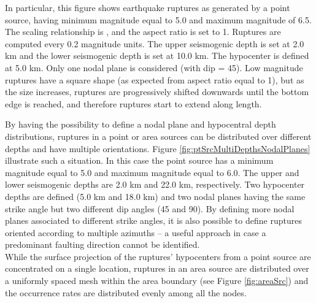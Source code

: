 \documentclass[11pt,a4paper,headings=small,dvips]{scrartcl}
\begin{document}
In particular, this figure shows earthquake ruptures as generated by 
a point source, having minimum magnitude equal to 5.0 and maximum 
magnitude of 6.5. The scaling relationship is \citet{wells1994}, and 
the aspect ratio is set to 1. Ruptures are computed every 0.2 magnitude 
units. 
The upper seismogenic depth is set at 2.0 km and the lower seismogenic 
depth is set at 10.0 km. The hypocenter is defined at 5.0 km. Only one 
nodal plane is considered (with dip = 45). Low magnitude ruptures have 
a square shape (as expected from aspect ratio equal to 1), but as the 
size increases, ruptures are progressively shifted downwards until the 
bottom edge is reached, and therefore ruptures start to extend along 
length.

By having the possibility to define a nodal plane and hypocentral depth 
distributions, ruptures in a point or area sources can be distributed 
over different depths and have multiple orientations. 
Figure \ref{fig:ptSrcMultiDepthsNodalPlanes} illustrate such a situation. 
In this case the point source has a minimum magnitude equal to 5.0 and maximum magnitude equal to 6.0. The upper and lower seismogenic depths are 2.0 km and 22.0 km, respectively. Two hypocenter depths are defined (5.0 km and 18.0 km) and two nodal planes having the same strike angle but two different dip angles (45 and 90). By defining more nodal planes associated to different strike angles, it is also possible to define ruptures oriented according to multiple azimuths -- a useful approach in case a predominant faulting direction cannot be identified.\\
While the surface projection of the ruptures' hypocenters from a point source are concentrated on a single location, ruptures in an area source are distributed over a uniformly spaced mesh within the area boundary (see Figure \ref{fig:areaSrc}) and the occurrence rates are distributed evenly among all the nodes.
\end{document}
